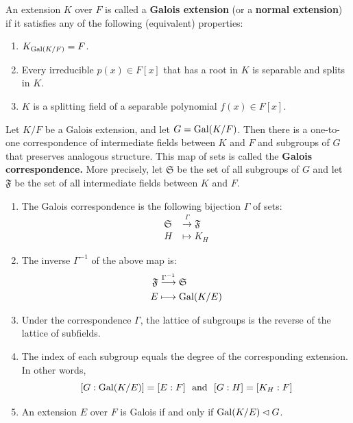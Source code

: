 \begin{definition}
    An extension $K$ over $F$ is called a \textbf{Galois extension} (or a \textbf{normal extension}) if it satisfies any of the following (equivalent) properties:
\begin{enumerate}
  \item $K_{\operatorname{Gal}(K/F)} = F$.
  \item Every irreducible $p(x)\in F[x]$ that has a root in $K$ is separable and splits in $K$.
  \item $K$ is a splitting field of a separable polynomial $f(x) \in F[x]$.
\end{enumerate}
\end{definition}
\begin{theorem}
    Let $K/F$ be a Galois extension, and let $G = \operatorname{Gal}(K/F)$.  Then there is a one-to-one correspondence of intermediate fields between $K$ and $F$ and subgroups of $G$ that preserves analogous structure.  This map of sets is called the \textbf{Galois correspondence.} More precisely, let $\mathfrak{S}$ be the set of all subgroups of $G$ and let $\mathfrak{F}$ be the set of all intermediate fields between $K$ and $F$.
\begin{enumerate}
  \item The Galois correspondence is the following bijection $\Gamma$ of sets:
      \begin{align*}
          \mathfrak{S} &\stackrel{\Gamma}\longrightarrow \mathfrak{F} \\ H &\longmapsto K_H
      \end{align*}
  \item The inverse $\Gamma^{-1}$ of the above map is:
      \begin{align*} \mathfrak{F} &\stackrel{\Gamma^{-1}}\longrightarrow \mathfrak{S} \\ E &\longmapsto \operatorname{Gal}(K/E)
      \end{align*}
  \item Under the correspondence $\Gamma$, the lattice of subgroups is the reverse of the lattice of subfields.
  \item The index of each subgroup equals the degree of the corresponding extension.  In other words,
      $$[G:\operatorname{Gal}(K/E)] = [E:F] \,\,\mbox{ and }\,\, [G:H] = [K_H:F]$$
  \item An extension $E$ over $F$ is Galois if and only if $\operatorname{Gal}(K/E) \lhd G$.
\end{enumerate}
    \label{thm:galcorr}
\end{theorem}

